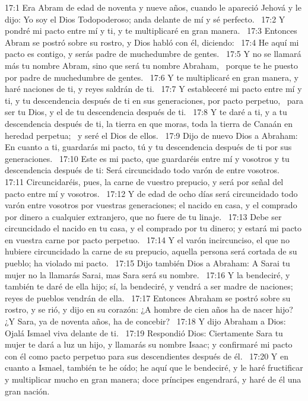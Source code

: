 17:1 Era Abram de edad de noventa y nueve años, cuando le apareció Jehová y le dijo: Yo soy el Dios Todopoderoso; anda delante de mí y sé perfecto.  
17:2 Y pondré mi pacto entre mí y ti, y te multiplicaré en gran manera.  
17:3 Entonces Abram se postró sobre su rostro, y Dios habló con él, diciendo:  
17:4 He aquí mi pacto es contigo, y serás padre de muchedumbre de gentes.  
17:5 Y no se llamará más tu nombre Abram, sino que será tu nombre Abraham,  porque te he puesto por padre de muchedumbre de gentes.  
17:6 Y te multiplicaré en gran manera, y haré naciones de ti, y reyes saldrán de ti.  
17:7 Y estableceré mi pacto entre mí y ti, y tu descendencia después de ti en sus generaciones, por pacto perpetuo,  para ser tu Dios, y el de tu descendencia después de ti.  
17:8 Y te daré a ti, y a tu descendencia después de ti, la tierra en que moras, toda la tierra de Canaán en heredad perpetua;  y seré el Dios de ellos.  
17:9 Dijo de nuevo Dios a Abraham: En cuanto a ti, guardarás mi pacto, tú y tu descendencia después de ti por sus generaciones.  
17:10 Este es mi pacto, que guardaréis entre mí y vosotros y tu descendencia después de ti: Será circuncidado todo varón de entre vosotros.  
17:11 Circuncidaréis, pues, la carne de vuestro prepucio, y será por señal del pacto entre mí y vosotros.  
17:12 Y de edad de ocho días será circuncidado todo varón entre vosotros por vuestras generaciones; el nacido en casa, y el comprado por dinero a cualquier extranjero, que no fuere de tu linaje.  
17:13 Debe ser circuncidado el nacido en tu casa, y el comprado por tu dinero; y estará mi pacto en vuestra carne por pacto perpetuo.  
17:14 Y el varón incircunciso, el que no hubiere circuncidado la carne de su prepucio, aquella persona será cortada de su pueblo; ha violado mi pacto.  
17:15 Dijo también Dios a Abraham: A Sarai tu mujer no la llamarás Sarai, mas Sara será su nombre.  
17:16 Y la bendeciré, y también te daré de ella hijo; sí, la bendeciré, y vendrá a ser madre de naciones; reyes de pueblos vendrán de ella.  
17:17 Entonces Abraham se postró sobre su rostro, y se rió, y dijo en su corazón: ¿A hombre de cien años ha de nacer hijo? ¿Y Sara, ya de noventa años, ha de concebir?  
17:18 Y dijo Abraham a Dios: Ojalá Ismael viva delante de ti.  
17:19 Respondió Dios: Ciertamente Sara tu mujer te dará a luz un hijo, y llamarás su nombre Isaac; y confirmaré mi pacto con él como pacto perpetuo para sus descendientes después de él.  
17:20 Y en cuanto a Ismael, también te he oído; he aquí que le bendeciré, y le haré fructificar y multiplicar mucho en gran manera; doce príncipes engendrará, y haré de él una gran nación. 
